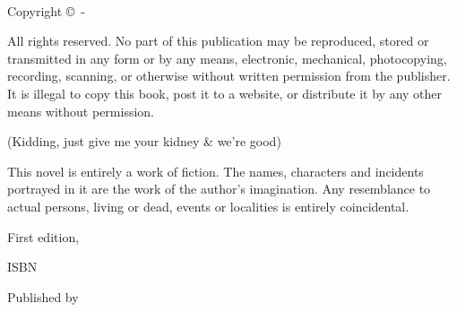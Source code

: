 
{\small
\setlength{\parindent}{0em}\setlength{\parskip}{1em}

~

\vfill

Copyright \copyright{} \startyear\,-\, \editionyear\, \authorname

All rights reserved. No part of this publication may be reproduced, stored or transmitted in any form or by any means, electronic, mechanical, photocopying, recording, scanning, or otherwise without written permission from the publisher. It is illegal to copy this book, post it to a website, or distribute it by any other means without permission.

(Kidding, just give me your kidney \& we're good)

This novel is entirely a work of fiction. The names, characters and incidents portrayed in it are the work of the author’s imagination. Any resemblance to actual persons, living or dead, events or localities is entirely coincidental.

First edition, \editionyear{}

ISBN \isbn{}  %

Published by \publisher{}
}
